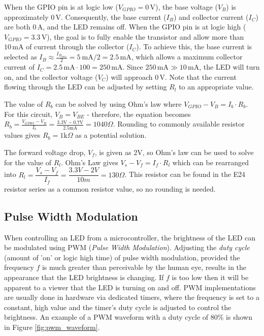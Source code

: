 \documentclass[main.tex]{subfiles}
\begin{document}
\noindent When the GPIO pin is at logic low (\( V_{GPIO} = 0\,\text{V} \)), the base voltage (\( V_B \)) is approximately \( 0\,\text{V} \). Consequently, the base current (\( I_B \)) and collector current (\( I_C \)) are both \( 0\,\text{A} \), and the LED remains off. When the GPIO pin is at logic high (\( V_{GPIO} = 3.3\,\text{V} \)), the goal is to fully enable the transistor and allow more than \( 10\,\text{mA} \) of current through the collector (\( I_C \)). To achieve this, the base current is selected as \( I_B \approx \frac{I_{B_{max}}}{2} = 5 \ \text{mA}/2 = 2.5\,\text{mA} \), which allows a maximum collector current of \( I_C = 2.5\,\text{mA} \cdot 100 = 250\,\text{mA} \). Since \( 250\,\text{mA} \gg 10\,\text{mA} \), the LED will turn on, and the collector voltage (\( V_C \)) will approach \( 0\,\text{V} \). Note that the current flowing through the LED can be adjusted by setting \( R_l \) to an appropriate value. \newline

\newnoindentpara The value of $R_b$ can be solved by using Ohm's law where $V_{GPIO} - V_B = I_b \cdot R_b$. For this circuit, $V_B = V_{BE}$ - therefore, the equation becomes $R_b = \frac{V_{GPIO} - V_B}{I_b} = \frac{3.3\text{V}-0.7\text{V}}{2.5 \text{mA}} = 1040 \Omega$. Rounding to commonly available resistor values gives  $R_b = 1 \text{k} \Omega$ as a potential solution. \newline

\newnoindentpara The forward voltage drop, $V_f$, is given as 2V, so Ohm's law can be used to solve for the value of $R_l$. Ohm's Law gives $V_s - V_f = I_f \cdot R_l$ which can be rearranged into $R_l = \dfrac{V_s - V_f}{I_f} = \dfrac{3.3V-2V}{10m} = 130 \Omega$. This resistor can be found in the E24 resistor series as a common resistor value, so no rounding is needed. 

\subsection{Pulse Width Modulation}
When controlling an LED from a microcontroller, the brightness of the LED can be modulated using PWM (\textit{Pulse Width Modulation}). Adjusting the \textit{duty cycle} (amount of 'on' or logic high time) of pulse width modulation, provided the frequency $f$ is much greater than perceivable by the human eye, results in the appearance that the LED brightness is changing. If $f$ is too low then it will be apparent to a viewer that the LED is turning on and off. PWM implementations are usually done in hardware via dedicated timers, where the frequency is set to a constant, high value and the timer's duty cycle is adjusted to control the brightness. An example of a PWM waveform with a duty cycle of 80\% is shown in Figure \ref{fig:pwm_waveform}.
\end{document}
